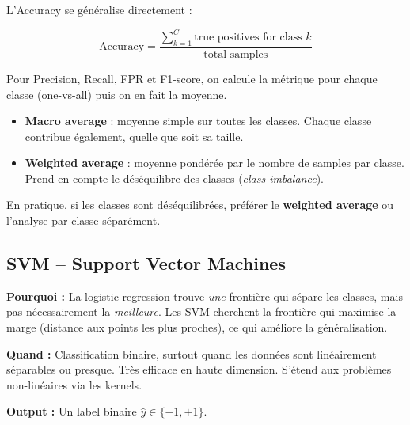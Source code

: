 \documentclass[11pt,a4paper,openany]{book}
\begin{document}
\vspace{0.8cm}

L'Accuracy se généralise directement :

\[
\mathrm{Accuracy}
=
\frac{
\sum_{k=1}^{C} \text{true positives for class } k
}{
\text{total samples}
}
\]

\vspace{0.8cm}

Pour Precision, Recall, FPR et F1-score, on calcule la métrique pour chaque classe (one-vs-all) puis on en fait la moyenne.

\vspace{0.4cm}

\begin{rembox}[title=Macro vs Weighted Average]
\begin{itemize}
    \item \textbf{Macro average} : moyenne simple sur toutes les classes. Chaque classe contribue également, quelle que soit sa taille.

    \item \textbf{Weighted average} : moyenne pondérée par le nombre de samples par classe. Prend en compte le déséquilibre des classes (\textit{class imbalance}).
\end{itemize}

En pratique, si les classes sont déséquilibrées, préférer le \textbf{weighted average} ou l'analyse par classe séparément.
\end{rembox}

\vspace{8cm}

\subsection{SVM -- Support Vector Machines}

\begin{rembox}[title=Pourquoi et quand utiliser les SVM ?]
\textbf{Pourquoi :} La logistic regression trouve \textit{une} frontière qui sépare les classes, mais pas nécessairement la \textit{meilleure}. Les SVM cherchent la frontière qui maximise la marge (distance aux points les plus proches), ce qui améliore la généralisation.

\vspace{0.3cm}

\textbf{Quand :} Classification binaire, surtout quand les données sont linéairement séparables ou presque. Très efficace en haute dimension. S'étend aux problèmes non-linéaires via les kernels.

\vspace{0.3cm}

\textbf{Output :} Un label binaire $\hat{y} \in \{-1, +1\}$.
\end{rembox}
\end{document}
